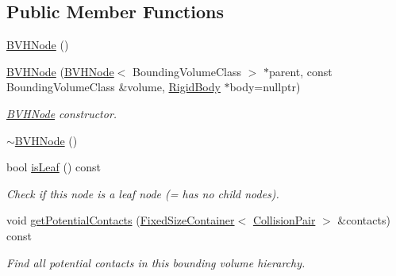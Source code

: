 \subsection*{Public Member Functions}
\begin{DoxyCompactItemize}
\item 
\mbox{\hyperlink{classr3_1_1_b_v_h_node_a31b8beb2d10f5df915be92eab4bdd7f6}{B\+V\+H\+Node}} ()
\item 
\mbox{\hyperlink{classr3_1_1_b_v_h_node_a983ae7d4ab515427436692b8a846da6f}{B\+V\+H\+Node}} (\mbox{\hyperlink{classr3_1_1_b_v_h_node}{B\+V\+H\+Node}}$<$ Bounding\+Volume\+Class $>$ $\ast$parent, const Bounding\+Volume\+Class \&volume, \mbox{\hyperlink{classr3_1_1_rigid_body}{Rigid\+Body}} $\ast$body=nullptr)
\begin{DoxyCompactList}\small\item\em \mbox{\hyperlink{classr3_1_1_b_v_h_node}{B\+V\+H\+Node}} constructor. \end{DoxyCompactList}\item 
\mbox{\hyperlink{classr3_1_1_b_v_h_node_a72194bd522058bfd362b0ab77c0303af}{$\sim$\+B\+V\+H\+Node}} ()
\item 
bool \mbox{\hyperlink{classr3_1_1_b_v_h_node_a517b40f1a91cda371b3cb786f1c7e155}{is\+Leaf}} () const
\begin{DoxyCompactList}\small\item\em Check if this node is a leaf node (= has no child nodes). \end{DoxyCompactList}\item 
void \mbox{\hyperlink{classr3_1_1_b_v_h_node_a922773e61c14d365f2b9c9740d565783}{get\+Potential\+Contacts}} (\mbox{\hyperlink{classr3_1_1_fixed_size_container}{Fixed\+Size\+Container}}$<$ \mbox{\hyperlink{classr3_1_1_collision_pair}{Collision\+Pair}} $>$ \&contacts) const
\begin{DoxyCompactList}\small\item\em Find all potential contacts in this bounding volume hierarchy. \end{DoxyCompactList}\end{DoxyCompactItemize}
